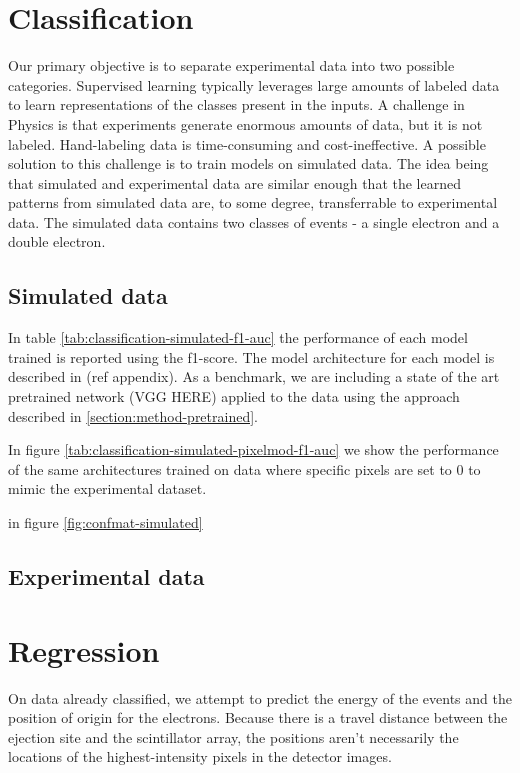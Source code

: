 \section{Classification}
Our primary objective is to separate experimental data into two possible categories.
Supervised learning typically leverages large amounts of labeled data to learn
representations of the classes present in the inputs. A challenge in Physics is that
experiments generate enormous amounts of data, but it is not labeled. Hand-labeling
data is time-consuming and cost-ineffective. A possible solution to this challenge
is to train models on simulated data. The idea being that simulated and experimental
data are similar enough that the learned patterns from simulated data are, to some degree,
transferrable to experimental data.
The simulated data contains two classes of events - a single electron and a double electron.

\subsection{Simulated data}
In table \ref{tab:classification-simulated-f1-auc} the performance of each model 
trained is reported using the f1-score. The model architecture for each model is described in (ref appendix).
As a benchmark, we are including a state of the art pretrained network (\cite{}VGG HERE) applied to the data 
using the approach described in \ref{section:method-pretrained}.

In figure \ref{tab:classification-simulated-pixelmod-f1-auc} we show the performance
of the same architectures trained on data where specific pixels are set to 0 to mimic
the experimental dataset.

in figure \ref{fig:confmat-simulated}

\subsection{Experimental data}

\section{Regression}
On data already classified, we attempt to predict the energy of the events and the position of origin for
the electrons. Because there is a travel distance between the ejection site and the scintillator array,
the positions aren't necessarily the locations of the highest-intensity pixels in the detector images.
